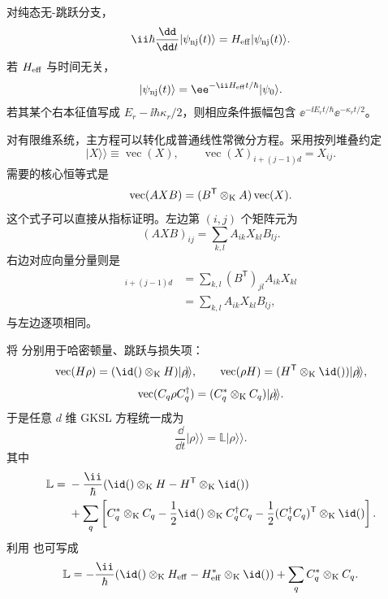 对纯态无-跳跃分支，
\begin{equation}
\ii\hbar\frac{\dd}{\dd t}|\psi_{\rm nj}(t)\rangle
=H_{\rm eff}|\psi_{\rm nj}(t)\rangle.
\label{eq:phys-oqs-nojump-schrodinger}
\end{equation}
若 $H_{\rm eff}$ 与时间无关，
\[
|\psi_{\rm nj}(t)\rangle
=\ee^{-\ii H_{\rm eff}t/\hbar}|\psi_0\rangle.
\]
若其某个右本征值写成 $E_r-\ii\hbar\kappa_r/2$，则相应条件振幅包含 $\ee^{-\ii E_rt/\hbar}\ee^{-\kappa_rt/2}$。

对有限维系统，主方程可以转化成普通线性常微分方程。采用按列堆叠约定
\[
|X\!\rangle\!\rangle\equiv\operatorname{vec}(X),
\qquad
\operatorname{vec}(X)_{i+(j-1)d}=X_{ij}.
\]
需要的核心恒等式是
\begin{equation}
\operatorname{vec}(AXB)
=(B^{\mathsf T}\mathbin{\otimes_{\rm K}} A)\operatorname{vec}(X).
\label{eq:phys-oqs-vec-axb}
\end{equation}
这个式子可以直接从指标证明。左边第 $(i,j)$ 个矩阵元为
\[
(AXB)_{ij}=\sum_{k,l}A_{ik}X_{kl}B_{lj}.
\]
右边对应向量分量则是
\begin{align}
[(B^{\mathsf T}\mathbin{\otimes_{\rm K}} A)\operatorname{vec}(X)]_{i+(j-1)d}
&=\sum_{k,l}(B^{\mathsf T})_{jl}A_{ik}X_{kl}\nonumber\\
&=\sum_{k,l}A_{ik}X_{kl}B_{lj},
\end{align}
与左边逐项相同。

将 分别用于哈密顿量、跳跃与损失项：
\[
\operatorname{vec}(H\rho)=(\id()\mathbin{\otimes_{\rm K}} H)|\rho\!\rangle\!\rangle,
\qquad
\operatorname{vec}(\rho H)=(H^{\mathsf T}\mathbin{\otimes_{\rm K}}\id())|\rho\!\rangle\!\rangle,
\]
\[
\operatorname{vec}(C_q\rho C_q^\dagger)
=(C_q^*\mathbin{\otimes_{\rm K}} C_q)|\rho\!\rangle\!\rangle.
\]
于是任意 $d$ 维 GKSL 方程统一成为
\begin{equation}
\frac{\dd}{\dd t}|\rho\!\rangle\!\rangle
=\mathbb L|\rho\!\rangle\!\rangle.
\label{eq:phys-oqs-liouville-evolution}
\end{equation}
其中
\begin{equation}
\begin{aligned}
\mathbb L={}&-\frac{\ii}{\hbar}
(\id()\mathbin{\otimes_{\rm K}} H-H^{\mathsf T}\mathbin{\otimes_{\rm K}}\id())\\
&+\sum_q\left[
C_q^*\mathbin{\otimes_{\rm K}} C_q
-\frac12\id()\mathbin{\otimes_{\rm K}} C_q^\dagger C_q
-\frac12(C_q^\dagger C_q)^{\mathsf T}\mathbin{\otimes_{\rm K}}\id()
\right].
\end{aligned}
\label{eq:phys-oqs-liouvillian-general}
\end{equation}
利用 也可写成
\begin{equation}
\mathbb L
=-\frac{\ii}{\hbar}
(\id()\mathbin{\otimes_{\rm K}} H_{\rm eff}-H_{\rm eff}^*\mathbin{\otimes_{\rm K}}\id())
+\sum_qC_q^*\mathbin{\otimes_{\rm K}} C_q.
\label{eq:phys-oqs-liouvillian-heff}
\end{equation}

